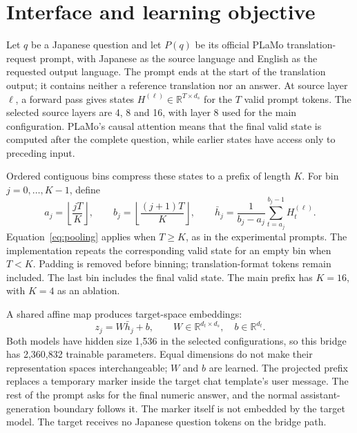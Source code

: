 \section{Interface and learning objective}

Let $q$ be a Japanese question and let $P(q)$ be its official PLaMo translation-request prompt, with Japanese as the source language and English as the requested output language.
The prompt ends at the start of the translation output; it contains neither a reference translation nor an answer.
At source layer $\ell$, a forward pass gives states
$H^{(\ell)} \in \mathbb{R}^{T\times d_s}$ for the $T$ valid prompt tokens.
The selected source layers are 4, 8 and 16, with layer 8 used for the main configuration.
PLaMo's causal attention means that the final valid state is computed after the complete question, while earlier states have access only to preceding input.

Ordered contiguous bins compress these states to a prefix of length $K$.
For bin $j=0,\ldots,K-1$, define
\begin{equation}
 a_j=\left\lfloor\frac{jT}{K}\right\rfloor,
 \qquad
 b_j=\left\lfloor\frac{(j+1)T}{K}\right\rfloor,
 \qquad
 \bar h_j=\frac{1}{b_j-a_j}\sum_{t=a_j}^{b_j-1}H^{(\ell)}_t.
 \label{eq:pooling}
\end{equation}
Equation~\ref{eq:pooling} applies when $T\geq K$, as in the experimental prompts.
The implementation repeats the corresponding valid state for an empty bin when $T<K$.
Padding is removed before binning; translation-format tokens remain included.
The last bin includes the final valid state.
The main prefix has $K=16$, with $K=4$ as an ablation.

A shared affine map produces target-space embeddings:
\begin{equation}
 z_j=W\bar h_j+b,
 \qquad W\in\mathbb{R}^{d_t\times d_s},
 \quad b\in\mathbb{R}^{d_t}.
 \label{eq:bridge}
\end{equation}
Both models have hidden size 1,536 in the selected configurations, so this bridge has 2,360,832 trainable parameters.
Equal dimensions do not make their representation spaces interchangeable; $W$ and $b$ are learned.
The projected prefix replaces a temporary marker inside the target chat template's user message.
The rest of the prompt asks for the final numeric answer, and the normal assistant-generation boundary follows it.
The marker itself is not embedded by the target model.
The target receives no Japanese question tokens on the bridge path.

